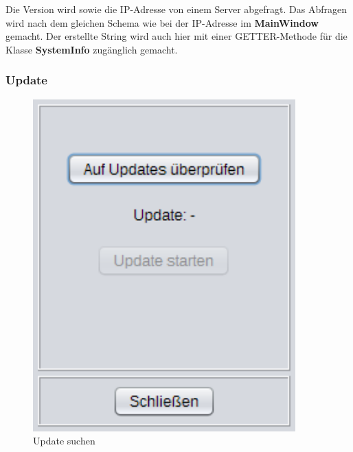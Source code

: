 Die Version wird sowie die IP-Adresse von einem Server abgefragt. Das Abfragen wird nach dem gleichen Schema wie bei der IP-Adresse im \textbf{MainWindow} gemacht. Der erstellte String wird auch hier mit einer GETTER-Methode für die Klasse \textbf{SystemInfo} zugänglich gemacht.


\newpage

\subsubsection{Update}\label{subsubsec:Update}
\begin{figure}[H]
  \begin{minipage}[hbt]{0.45\textwidth}
    \includegraphics[width=0.9\textwidth]{Bilder/GUI/Update1}
 	\caption{Update suchen}
  	\label{Update}
  \end{minipage}
\hspace{.03\linewidth}
  \begin{minipage}[hbt]{0.45\textwidth}

\end{minipage}
\end{figure}
